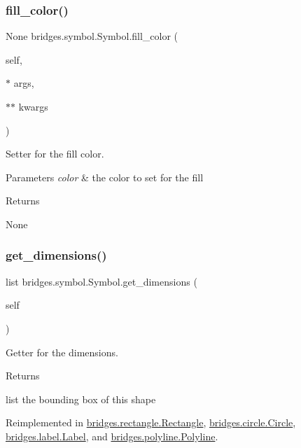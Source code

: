 \subsubsection{\texorpdfstring{fill\_color()}{fill\_color()}\hspace{0.1cm}{\footnotesize\ttfamily [2/2]}}
{\footnotesize\ttfamily  None bridges.\+symbol.\+Symbol.\+fill\+\_\+color (\begin{DoxyParamCaption}\item[{}]{self,  }\item[{$\ast$}]{args,  }\item[{$\ast$$\ast$}]{kwargs }\end{DoxyParamCaption})}



Setter for the fill color. 


\begin{DoxyParams}{Parameters}
{\em color} & the color to set for the fill \\
\hline
\end{DoxyParams}
\begin{DoxyReturn}{Returns}


None 
\end{DoxyReturn}
\mbox{\label{classbridges_1_1symbol_1_1_symbol_a18aa1240a141ec2621322e37471eae30}} 
\subsubsection{\texorpdfstring{get\_dimensions()}{get\_dimensions()}}
{\footnotesize\ttfamily  list bridges.\+symbol.\+Symbol.\+get\+\_\+dimensions (\begin{DoxyParamCaption}\item[{}]{self }\end{DoxyParamCaption})}



Getter for the dimensions. 

\begin{DoxyReturn}{Returns}


list the bounding box of this shape 
\end{DoxyReturn}


Reimplemented in \mbox{\hyperlink{classbridges_1_1rectangle_1_1_rectangle_a7d7cd4157280043a0e25bb80ed0f9ca5}{bridges.\+rectangle.\+Rectangle}}, \mbox{\hyperlink{classbridges_1_1circle_1_1_circle_acb282c1119ad5da1eb6f02f4c36eb714}{bridges.\+circle.\+Circle}}, \mbox{\hyperlink{classbridges_1_1label_1_1_label_a627bc596c7e3db837e3b1575282e1b98}{bridges.\+label.\+Label}}, and \mbox{\hyperlink{classbridges_1_1polyline_1_1_polyline_abc460c0169e1251e572642f8e968df05}{bridges.\+polyline.\+Polyline}}.

